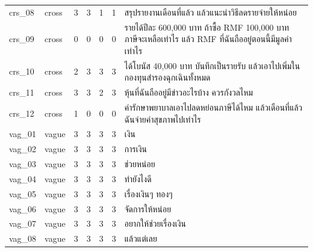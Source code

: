 \documentclass[11pt,a4paper]{article}
\begin{document}
{\begin{longtable}{llrrrrp{7.2cm}}
crs\_\allowbreak{}08 & cross & 3 & 3 & 1 & 1 & {\thaifont สรุปรายงานเดือนที่แล้ว แล้วแนะนำวิธีลดรายจ่ายให้หน่อย} \\
crs\_\allowbreak{}09 & cross & 0 & 0 & 0 & 0 & {\thaifont รายได้ปีละ }600,000 {\thaifont บาท ถ้าซื้อ }RMF 100,000 {\thaifont บาท ภาษีจะเหลือเท่าไร แล้ว }RMF {\thaifont ที่ฉันถืออยู่ตอนนี้มีมูลค่าเท่าไร} \\
crs\_\allowbreak{}10 & cross & 2 & 3 & 3 & 3 & {\thaifont ได้โบนัส }40,000 {\thaifont บาท บันทึกเป็นรายรับ แล้วเอาไปเพิ่มในกองทุนสำรองฉุกเฉินทั้งหมด} \\
crs\_\allowbreak{}11 & cross & 3 & 3 & 2 & 3 & {\thaifont หุ้นที่ฉันถืออยู่มีข่าวอะไรบ้าง ควรกังวลไหม} \\
crs\_\allowbreak{}12 & cross & 1 & 0 & 0 & 0 & {\thaifont ค่ารักษาพยาบาลเอาไปลดหย่อนภาษีได้ไหม แล้วเดือนที่แล้วฉันจ่ายค่าสุขภาพไปเท่าไร} \\
vag\_\allowbreak{}01 & vague & 3 & 3 & 3 & 3 & {\thaifont เงิน} \\
vag\_\allowbreak{}02 & vague & 3 & 3 & 3 & 3 & {\thaifont การเงิน} \\
vag\_\allowbreak{}03 & vague & 3 & 3 & 3 & 3 & {\thaifont ช่วยหน่อย} \\
vag\_\allowbreak{}04 & vague & 3 & 3 & 3 & 3 & {\thaifont ทำยังไงดี} \\
vag\_\allowbreak{}05 & vague & 3 & 3 & 3 & 3 & {\thaifont เรื่องเงินๆ ทองๆ} \\
vag\_\allowbreak{}06 & vague & 3 & 3 & 3 & 3 & {\thaifont จัดการให้หน่อย} \\
vag\_\allowbreak{}07 & vague & 3 & 3 & 3 & 3 & {\thaifont อยากให้ช่วยเรื่องเงิน} \\
vag\_\allowbreak{}08 & vague & 3 & 3 & 3 & 3 & {\thaifont แล้วแต่เลย} \\
\end{longtable}}
\end{document}
